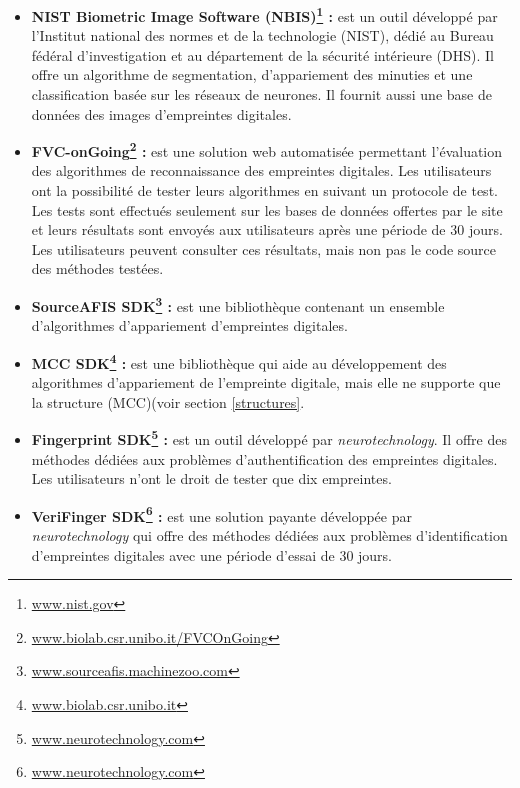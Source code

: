 \begin{itemize}
	
	\item \textbf{NIST Biometric Image Software (NBIS)\footnote{\href{https://www.nist.gov/services-resources/software/nist-biometric-image-software-nbis}{www.nist.gov}} :} est un outil développé par l’Institut national des normes et de la technologie (NIST), dédié au Bureau fédéral d'investigation et au département de la sécurité intérieure (DHS). Il offre un algorithme de segmentation, d’appariement des minuties et une classification basée sur les réseaux de neurones. Il fournit aussi une base de données des images d’empreintes digitales. 
	
	\item \textbf{FVC-onGoing\footnote{\href{https://biolab.csr.unibo.it/FVCOnGoing/UI/Form/Home.aspx}{www.biolab.csr.unibo.it/FVCOnGoing}} :} est une solution web automatisée permettant l’évaluation des algorithmes de reconnaissance des empreintes digitales. Les utilisateurs ont la possibilité de tester leurs algorithmes en suivant un protocole de test. Les tests sont effectués seulement sur les bases de données offertes par le site et leurs résultats sont envoyés aux utilisateurs après une période de 30 jours. Les utilisateurs peuvent consulter ces résultats, mais non pas le code source des méthodes testées.
	
	\item \textbf{SourceAFIS SDK\footnote{\href{https://sourceafis.machinezoo.com/}{www.sourceafis.machinezoo.com}} :} est une bibliothèque contenant un ensemble d’algorithmes d’appariement d’empreintes digitales.
	
	\item \textbf{MCC SDK\footnote{\href{http://biolab.csr.unibo.it/research.asp}{www.biolab.csr.unibo.it}} :} est une bibliothèque qui aide au développement des algorithmes d’appariement de l’empreinte digitale, mais elle ne supporte que la structure (MCC)(voir section \ref{structures}.
	
	\item \textbf{Fingerprint SDK\footnote{\href{http://www.neurotechnology.com/free-fingerprint-verification-sdk.html}{www.neurotechnology.com}} :} est un outil développé par \textit{neurotechnology}. Il offre des méthodes dédiées aux problèmes d’authentification des empreintes digitales. Les utilisateurs n’ont le droit de tester que dix empreintes.
	
	\item \textbf{VeriFinger SDK\footnote{\href{http://www.neurotechnology.com/free-fingerprint-verification-sdk.html}{www.neurotechnology.com}} :} est une solution payante développée par \textit{neurotechnology} qui offre des méthodes dédiées aux problèmes d'identification d’empreintes digitales avec une période d’essai de 30 jours.
	

\end{itemize}
